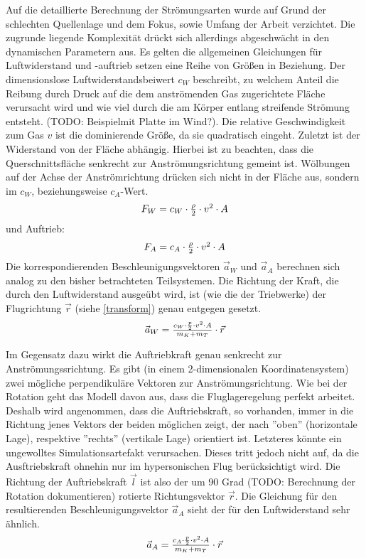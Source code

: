 Auf die detaillierte Berechnung der Strömungsarten wurde auf Grund der schlechten Quellenlage und dem Fokus, sowie Umfang der Arbeit verzichtet. Die zugrunde liegende Komplexität drückt sich allerdings abgeschwächt in den dynamischen Parametern aus. Es gelten die allgemeinen Gleichungen für Luftwiderstand und -auftrieb setzen eine Reihe von Größen in Beziehung. Der dimensionslose Luftwiderstandsbeiwert $c_W$ beschreibt, zu welchem Anteil die Reibung durch Druck auf die dem anströmenden Gas zugerichtete Fläche verursacht wird  und wie viel durch die am Körper entlang streifende Strömung entsteht. (TODO: Beispielmit Platte im Wind?). Die relative Geschwindigkeit zum Gas $v$ ist die dominierende Größe, da sie quadratisch eingeht. Zuletzt ist der Widerstand von der Fläche abhängig. Hierbei ist zu beachten, dass die Querschnittsfläche senkrecht zur Anströmungsrichtung gemeint ist. Wölbungen auf der Achse der Anströmrichtung drücken sich nicht in der Fläche aus, sondern im $c_W$, beziehungsweise $c_A$-Wert.
\begin{equation}
	$$ F_W = c_W \cdot \frac{\rho}{2} \cdot v^{2} \cdot A $$
\end{equation}
und Auftrieb:
\begin{equation}
	$$ F_A = c_A \cdot \frac{\rho}{2} \cdot v^{2} \cdot A $$
\end{equation}
Die korrespondierenden Beschleunigungsvektoren $\vec a_W$ und $\vec a_A$ berechnen sich analog zu den bisher betrachteten Teilsystemen. Die Richtung der Kraft, die durch den Luftwiderstand ausgeübt wird, ist (wie die der Triebwerke) der Flugrichtung $\vec r$ (siehe \ref{transform}) genau entgegen gesetzt.
\begin{equation}
	$$ \vec a_W = \frac{c_W \cdot \frac{p}{2} \cdot v^{2} \cdot A}{m_K + m_T} \cdot \vec r $$
\end{equation}

Im Gegensatz dazu wirkt die Auftriebkraft genau senkrecht zur Anströmungssrichtung. Es gibt (in einem 2-dimensionalen Koordinatensystem) zwei mögliche perpendikuläre Vektoren zur Anströmungsrichtung. Wie bei der Rotation geht das Modell davon aus, dass die Fluglageregelung perfekt arbeitet. Deshalb wird angenommen, dass die Auftriebskraft, so vorhanden, immer in die Richtung jenes Vektors der beiden möglichen zeigt, der nach ''oben'' (horizontale Lage), respektive ''rechts'' (vertikale Lage) orientiert ist. Letzteres könnte ein ungewolltes Simulationsartefakt verursachen. Dieses tritt jedoch nicht auf, da die Ausftriebskraft ohnehin nur im hypersonischen Flug berücksichtigt wird. Die Richtung der Auftriebskraft $\vec l$ ist also der um 90 Grad (TODO: Berechnung der Rotation dokumentieren) rotierte Richtungsvektor $\vec r$. Die Gleichung für den resultierenden Beschleunigungsvektor $\vec a_A$ sieht der für den Luftwiderstand sehr ähnlich.
\begin{equation}
	$$ \vec a_A = \frac{c_A \cdot \frac{p}{2} \cdot v^{2} \cdot A}{m_K + m_T} \cdot \vec r$$
\end{equation}
